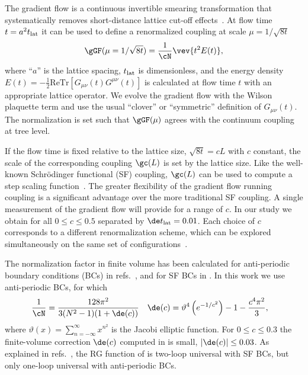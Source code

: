 
The gradient flow is a continuous invertible smearing transformation that systematically removes short-distance lattice cut-off effects~\cite{Luscher:2009eq, Luscher:2010iy}.
At flow time $t = a^2 t_{\rm{lat}}$ it can be used to define a renormalized coupling at scale $\mu = 1 / \sqrt{8t}$
\begin{equation}
  \label{eq:def_g2}
  \gGF(\mu = 1 / \sqrt{8t}) = \frac{1}{\cN} \vev{t^2 E(t)},
\end{equation}
where ``$a$'' is the lattice spacing, $t_{\rm{lat}}$ is dimensionless, and the energy density $E(t) = -\frac{1}{2}\mbox{ReTr}\left[G_{\mu\nu}(t) G^{\mu\nu}(t)\right]$ is calculated at flow time $t$ with an appropriate lattice operator.
We evolve the gradient flow with the Wilson plaquette term and use the usual ``clover'' or ``symmetric'' definition of $G_{\mu\nu}(t)$.
The normalization \cN is set such that $\gGF(\mu)$ agrees with the continuum \MSbar coupling at tree level.

If the flow time is fixed relative to the lattice size, $\sqrt{8t} = cL$ with $c$ constant, the scale of the corresponding coupling $\gc(L)$ is set by the lattice size.
Like the well-known Schr\"odinger functional (SF) coupling, $\gc(L)$ can be used to compute a step scaling function~\cite{Fodor:2012td, Fodor:2012qh, Fritzsch:2013je}.
The greater flexibility of the gradient flow running coupling is a significant advantage over the more traditional SF coupling.
A single measurement of the gradient flow will provide \gc for a range of $c$.
In our study we obtain \gc for all $0 \leq c \leq 0.5$ separated by $\de t_{\rm{lat}} = 0.01$.
Each choice of $c$ corresponds to a different renormalization scheme, which can be explored simultaneously on the same set of configurations~\cite{Fritzsch:2013je}.

The normalization factor \cN in finite volume has been calculated for anti-periodic boundary conditions (BCs) in refs.~\cite{Fodor:2012td, Fodor:2012qh}, and for SF BCs in .
In this work we use anti-periodic BCs, for which
\begin{align}
  \frac{1}{\cN} & = \frac{128\pi^2}{3(N^2 - 1)(1 + \de(c))} &
  \de(c) & = \vartheta^4\left(e^{-1 / c^2}\right) - 1 - \frac{c^4 \pi^2}{3},
\end{align}
where $\vartheta(x) = \sum_{n = -\infty}^{\infty} x^{n^2}$ is the Jacobi elliptic function.
For $0 \leq c \leq 0.3$ the finite-volume correction $\de(c)$ computed in  is small, $|\de(c)| \leq 0.03$.
As explained in refs.~\cite{Fodor:2012td, Fodor:2012qh}, the RG \be function of \gGF is two-loop universal with SF BCs, but only one-loop universal with anti-periodic BCs.

